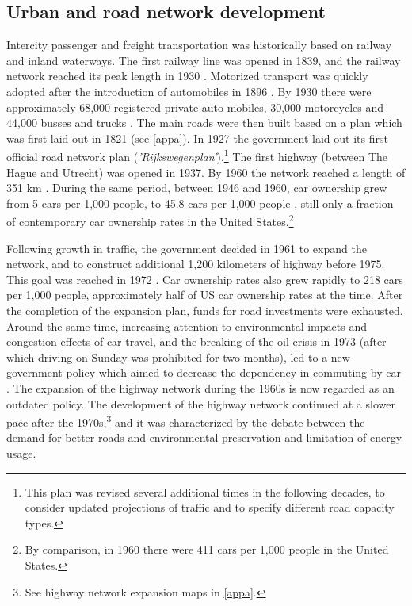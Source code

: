 \documentclass[a4paper,authoryear,review]{elsarticle}  	%
\begin{document}
\subsection{Urban and road network development}	
	Intercity passenger and freight transportation was historically based on railway and inland waterways. The first railway line was opened in 1839, and the railway network reached its peak length in 1930 \citep{Koopmans2012}. Motorized transport was quickly adopted after the introduction of automobiles in 1896 \citep{Smaal2012}. By 1930 there were approximately 68,000 registered private auto-mobiles, 30,000 motorcycles and 44,000 busses and trucks \citep{Veenendaal1996}. The main roads were then built based on a plan which was first laid out in 1821 (see \ref{appa}). In 1927 the government laid out its first official road network plan (\emph{'Rijkswegenplan'}).\footnote{This plan was revised several additional times in the following decades, to consider updated projections of traffic and to specify different road capacity types.} The first highway (between The Hague and Utrecht) was opened in 1937. By 1960 the network reached a length of 351 km \citep{Smaal2012}. During the same period, between 1946 and 1960, car ownership grew from 5 cars per 1,000 people, to 45.8 cars per 1,000 people \citep{Ligtermoet1990}, still only a fraction of contemporary car ownership rates in the United States.\footnote{By comparison, in 1960 there were 411 cars per 1,000 people in the United States.}
	
	Following growth in traffic, the government decided in 1961 to expand the network, and to construct additional 1,200 kilometers of highway before 1975. This goal was reached in 1972 \citep{Ligtermoet1990}. Car ownership rates also grew rapidly to 218 cars per 1,000 people, approximately half of US car ownership rates at the time. After the completion of the expansion plan, funds for road investments were exhausted. Around the same time, increasing attention to environmental impacts and congestion effects of car travel, and the breaking of the oil crisis in 1973 (after which driving on Sunday was prohibited for two months), led to a new government policy which aimed to decrease the dependency in commuting by car \citep{Ligtermoet1990,Schwanen2004,Smaal2012}. The expansion of the highway network during the 1960s is now regarded as an outdated policy. The development of the highway network continued at a slower pace after the 1970s,\footnote{See highway network expansion maps in \ref{appa}.} and it was characterized by the debate between the demand for better roads and environmental preservation and limitation of energy usage. 
	
\end{document}
